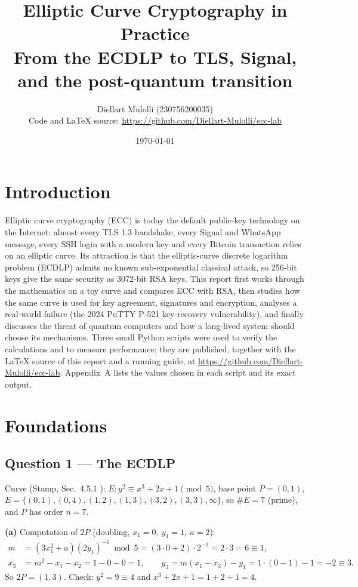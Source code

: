 \documentclass[11pt,a4paper]{article}
\title{\textbf{Elliptic Curve Cryptography in Practice}\\[0.3em]
\large From the ECDLP to TLS, Signal, and the post-quantum transition}
\author{Diellart Mulolli (230756200035)\\[0.2em] \small Code and LaTeX source: \url{https://github.com/Diellart-Mulolli/ecc-lab}}
\date{\today}
\begin{document}
\maketitle

\section*{Introduction}
Elliptic curve cryptography (ECC) is today the default public-key technology on the Internet:
almost every TLS 1.3 handshake, every Signal and WhatsApp message, every SSH login with a
modern key and every Bitcoin transaction relies on an elliptic curve. Its attraction is that the
elliptic-curve discrete logarithm problem (ECDLP) admits no known sub-exponential classical
attack, so 256-bit keys give the same security as 3072-bit RSA keys. This report first works through the
mathematics on a toy curve and compares ECC with RSA, then studies how the same curve is used
for key agreement, signatures and encryption, analyses a real-world failure (the 2024 PuTTY
P-521 key-recovery vulnerability), and finally discusses the threat of quantum computers and
how a long-lived system should choose its mechanisms. Three small Python scripts were used to verify the calculations and to measure performance; they are
published, together with the LaTeX source of this report and a running guide, at \url{https://github.com/Diellart-Mulolli/ecc-lab}. Appendix~A lists the values chosen in each
script and its exact output.

\section*{Foundations}

\subsection*{Question 1 --- The ECDLP}
Curve (Stamp, Sec.~4.5.1 \cite{stamp}): $E: y^2 \equiv x^3 + 2x + 1 \pmod 5$, base point $P=(0,1)$, $E=\{(0,1),(0,4),(1,2),(1,3),(3,2),(3,3),\infty\}$, so $\#E = 7$ (prime), and $P$ has order $n=7$.

\textbf{(a)} Computation of $2P$ (doubling, $x_1=0,\ y_1=1,\ a=2$):
\begin{align*}
m &= (3x_1^2 + a)(2y_1)^{-1} \bmod 5 = (3\cdot 0 + 2)\cdot 2^{-1} = 2\cdot 3 = 6 \equiv 1,\\
x_3 &= m^2 - x_1 - x_2 = 1 - 0 - 0 = 1, \qquad
y_3 = m(x_1 - x_3) - y_1 = 1\cdot(0-1) - 1 = -2 \equiv 3 .
\end{align*}
So $2P=(1,3)$. Check: $y^2 = 9 \equiv 4$ and $x^3+2x+1 = 1+2+1 = 4$. \checkmark
\end{document}
